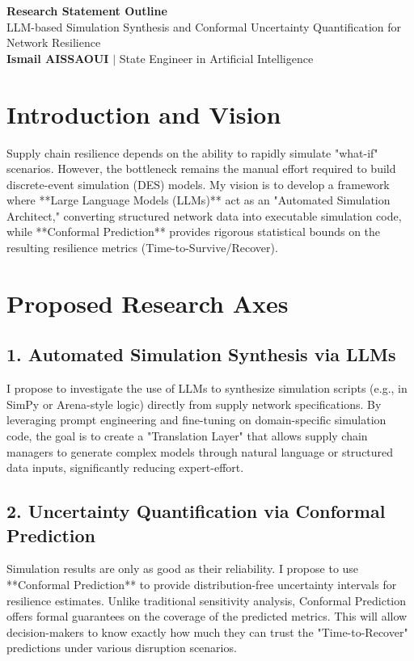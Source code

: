 \documentclass[11pt,a4paper]{article}
\begin{document}
\begin{center}
    {\LARGE\bfseries\color{mtunavy} Research Statement Outline}\\[6pt]
    {\large LLM-based Simulation Synthesis and Conformal Uncertainty Quantification for Network Resilience}\\[4pt]
    \textbf{Ismail AISSAOUI} $|$ State Engineer in Artificial Intelligence
\end{center}

\bigskip

\section{Introduction and Vision}
Supply chain resilience depends on the ability to rapidly simulate "what-if" scenarios. However, the bottleneck remains the manual effort required to build discrete-event simulation (DES) models. My vision is to develop a framework where **Large Language Models (LLMs)** act as an "Automated Simulation Architect," converting structured network data into executable simulation code, while **Conformal Prediction** provides rigorous statistical bounds on the resulting resilience metrics (Time-to-Survive/Recover).

\section{Proposed Research Axes}

\subsection{1. Automated Simulation Synthesis via LLMs}
I propose to investigate the use of LLMs to synthesize simulation scripts (e.g., in SimPy or Arena-style logic) directly from supply network specifications. By leveraging prompt engineering and fine-tuning on domain-specific simulation code, the goal is to create a "Translation Layer" that allows supply chain managers to generate complex models through natural language or structured data inputs, significantly reducing expert-effort.

\subsection{2. Uncertainty Quantification via Conformal Prediction}
Simulation results are only as good as their reliability. I propose to use **Conformal Prediction** to provide distribution-free uncertainty intervals for resilience estimates. Unlike traditional sensitivity analysis, Conformal Prediction offers formal guarantees on the coverage of the predicted metrics. This will allow decision-makers to know exactly how much they can trust the "Time-to-Recover" predictions under various disruption scenarios.
\end{document}
